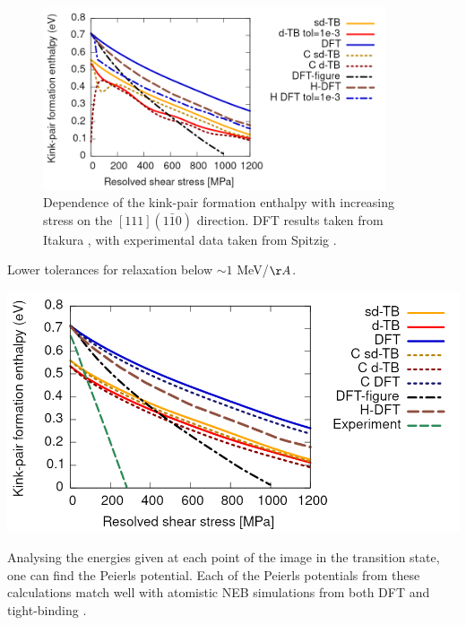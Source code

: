 \documentclass[a4paper,11pt]{article}
\begin{document}
\begin{figure}[htbp]

\includegraphics[width=0.9\textwidth]{Images/img_comparison_of_kink_pair_energies_real_stress_with_C.png}
\caption{Dependence of the kink-pair formation enthalpy with increasing stress on the \([111](1\bar{1}0)\) direction. DFT results taken from Itakura \cite{Itakura2012}, with experimental data taken from Spitzig \cite{Spitzig_1970}    \label{kinkpairstress}.}
\end{figure}

Lower tolerances for relaxation below \(\sim 1\) MeV/\(\AA\). 
 \begin{center}
\includegraphics[width=.9\linewidth]{Images/img_comparison_of_kink_pair_energies_real_stress.png}
\end{center}


Analysing the energies given at each point of the image in the transition state, one
can find the Peierls potential. Each of the Peierls potentials from these calculations
match well with atomistic NEB simulations from both DFT and tight-binding
\cite{Ventelon_2013,Simpson2019}.
\end{document}
